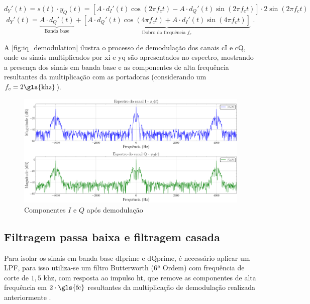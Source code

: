 \vspace{-1.2em}
\begin{equation}
d_Y'(t) = s(t) \cdot y_Q(t) = \left[A \cdot d_I'(t) \cos(2\pi f_c t ) - A \cdot d_Q'(t) \sin(2\pi f_c t )\right] \cdot 2\sin(2\pi f_c t )
\end{equation}
\vspace{-0.8em}
\begin{equation}
    d_Y'(t) =  
    \underbrace{A \cdot d_Q'(t)}_{\text{Banda base}} + 
    \underbrace{\left[
        A \cdot d_Q'(t) \cos(4\pi f_c t ) 
        + A \cdot d_I'(t) \sin(4\pi f_c t )
    \right]}_{\text{Dobro da frequência $f_c$}} \text{ .}
\end{equation}

A \autoref{fig:iq_demodulation} ilustra o processo de demodulação dos canais \gls{cI} e \gls{cQ}, onde os sinais multiplicados por \gls{xi} e \gls{yq} são apresentados no espectro, mostrando a presença dos sinais em banda base e as componentes de alta frequência resultantes da multiplicação com as portadoras (considerando um $f_c = 2 \text{\gls{khz}}$). \cite{cnes_services_and_message_formats_ed2_rev2_2006}

\begin{figure}[H]
	\centering
	\caption{Componentes $I$ e $Q$ após demodulação}\label{fig:iq_demodulation}
	\includegraphics[width=\linewidth]{assets/cap2/iq_demodulation.pdf}
\end{figure}


\subsection{Filtragem passa baixa e filtragem casada}\label{sec:filtering}

Para isolar os sinais em banda base \gls{dIprime} e \gls{dQprime}, é necessário aplicar um \gls{LPF}, para isso utiliza-se um filtro Butterworth (6ª Ordem) com frequência de corte de $1,5$ \gls{khz}, com resposta ao impulso \gls{ht}, que remove as componentes de alta frequência em $2 \cdot \text{\gls{fc}}$ resultantes da multiplicação de demodulação realizada anteriormente \cite{rodrigues_demodulador_2018}.

